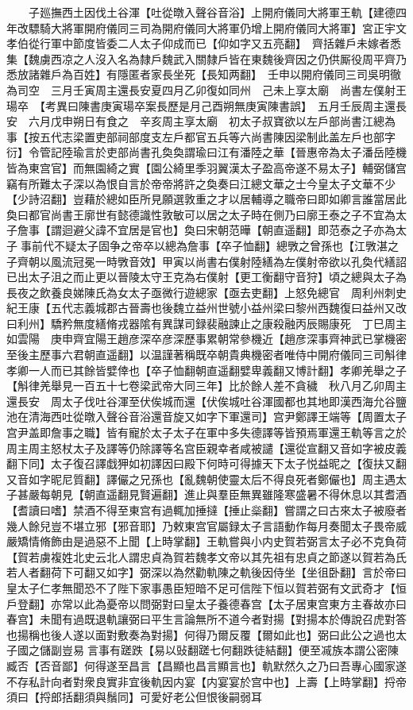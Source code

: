 　　子廵撫西土因伐土谷渾【吐從暾入聲谷音浴】上開府儀同大將軍王軌【建德四年改驃騎大將軍開府儀同三司為開府儀同大將軍仍增上開府儀同大將軍】宮正宇文孝伯從行軍中節度皆委二人太子仰成而已【仰如字又五亮翻】　齊括雜戶未嫁者悉集【魏虜西凉之人沒入名為隸戶魏武入關隸戶皆在東魏後齊因之仍供厮役周平齊乃悉放諸雜戶為百姓】有隱匿者家長坐死【長知两翻】　壬申以開府儀同三司吳明徹為司空　三月壬寅周主還長安夏四月乙卯復如同州　己未上享太廟　尚書左僕射王瑒卒　【考異曰陳書庚寅瑒卒案長歷是月己酉朔無庚寅陳書誤】　五月壬辰周主還長安　六月戊申朔日有食之　辛亥周主享太廟　初太子叔寶欲以左戶部尚書江總為事【按五代志梁置吏部祠部度支左戶都官五兵等六尚書陳因梁制此盖左戶也部字衍】令管記陸瑜言於吏部尚書孔奐奐謂瑜曰江有潘陸之華【晉惠帝為太子潘岳陸機皆為東宫官】而無園綺之實【園公綺里季羽翼漢太子盈高帝遂不易太子】輔弼儲宫竊有所難太子深以為恨自言於帝帝將許之奐奏曰江總文華之士今皇太子文華不少【少詩沼翻】豈藉於總如臣所見願選敦重之才以居輔導之職帝曰即如卿言誰當居此奐曰都官尚書王廓世有懿德識性敦敏可以居之太子時在側乃曰廓王泰之子不宜為太子詹事【謂迴避父諱不宜居是官也】奐曰宋朝范曄【朝直遥翻】即范泰之子亦為太子事前代不疑太子固争之帝卒以總為詹事【卒子恤翻】總斆之曾孫也【江斆湛之子齊朝以風流冠冕一時斆音效】甲寅以尚書右僕射陸繕為左僕射帝欲以孔奐代繕詔已出太子沮之而止更以晉陵太守王克為右僕射【更工衡翻守音狩】頃之總與太子為長夜之飲養良娣陳氏為女太子亟微行遊總家【亟去吏翻】上怒免總官　周利州刺史紀王康【五代志義城郡古晉壽也後魏立益州世號小益州梁曰黎州西魏復曰益州又改曰利州】驕矜無度繕脩戎器隂有異謀司録裴融諫止之康殺融丙辰賜康死　丁巳周主如雲陽　庚申齊宜陽王趙彦深卒彦深歷事累朝常參機近【趙彦深事齊神武已掌機密至後主歷事六君朝直遥翻】以温謹著稱既卒朝貴典機密者唯侍中開府儀同三司斛律孝卿一人而已其餘皆嬖倖也【卒子恤翻朝直遥翻嬖卑義翻又博計翻】孝卿羌舉之子【斛律羌舉見一百五十七卷梁武帝大同三年】比於餘人差不貪穢　秋八月乙卯周主還長安　周太子伐吐谷渾至伏俟城而還【伏俟城吐谷渾國都也其地即漢西海允谷鹽池在清海西吐從暾入聲谷音浴還音旋又如字下軍還司】宫尹鄭譯王端等【周置太子宫尹盖即詹事之職】皆有寵於太子太子在軍中多失德譯等皆預焉軍還王軌等言之於周主周主怒杖太子及譯等仍除譯等名宫臣親幸者咸被譴【還從宣翻又音如字被皮義翻下同】太子復召譯戱狎如初譯因曰殿下何時可得據天下太子悦益昵之【復扶又翻又音如字昵尼質翻】譯儼之兄孫也【亂魏朝使靈太后不得良死者鄭儼也】周主遇太子甚嚴每朝見【朝直遥翻見賢遍翻】進止與羣臣無異雖隆寒盛暑不得休息以其耆酒【耆讀曰嗜】禁酒不得至東宫有過輒加捶撻【捶止橤翻】嘗謂之曰古來太子被廢者幾人餘兒豈不堪立邪【邪音耶】乃敕東宫官屬録太子言語動作每月奏聞太子畏帝威嚴矯情脩飾由是過惡不上聞【上時掌翻】王軌嘗與小内史賀若弼言太子必不克負荷【賀若虜複姓北史云北人謂忠貞為賀若魏孝文帝以其先祖有忠貞之節遂以賀若為氏若人者翻荷下可翻又如字】弼深以為然勸軌陳之軌後因侍坐【坐徂卧翻】言於帝曰皇太子仁孝無聞恐不了陛下家事愚臣短暗不足可信陛下恒以賀若弼有文武奇才【恒戶登翻】亦常以此為憂帝以問弼對曰皇太子養德春宫【太子居東宫東方主春故亦曰春宫】未聞有過既退軌讓弼曰平生言論無所不道今者對揚【對揚本於傳說召虎對答也揚稱也後人遂以面對敷奏為對揚】何得乃爾反覆【爾如此也】弼曰此公之過也太子國之儲副豈易言事有蹉跌【易以䜴翻蹉七何翻跌徒結翻】便至㓕族本謂公密陳臧否【否音鄙】何得遂至昌言【昌顯也昌言顯言也】軌默然久之乃曰吾專心國家遂不存私計向者對衆良實非宜後軌因内宴【内宴宴於宫中也】上壽【上時掌翻】捋帝須曰【捋郎括翻須與鬚同】可愛好老公但恨後嗣弱耳